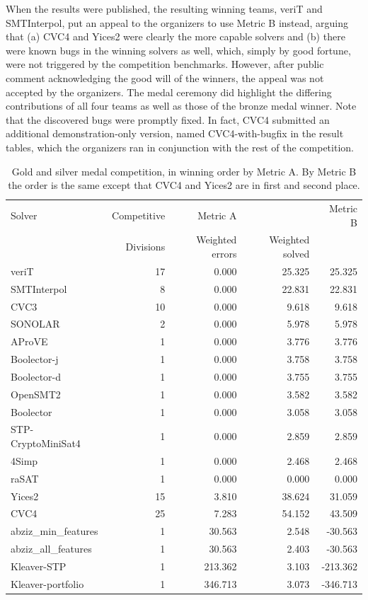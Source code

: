 \documentclass[twoside,11pt]{article}
\begin{document}
When the results were published, the resulting winning teams, veriT and SMTInterpol, put an appeal to the organizers to use Metric B instead, arguing that (a) CVC4 and Yices2 were clearly the more capable solvers and (b) there were known bugs in the winning solvers as well, which, simply by good fortune, were not triggered by the competition benchmarks. However, after public comment acknowledging the good will of the winners, the appeal was not accepted by the organizers. The medal ceremony did highlight the differing contributions of all four teams as well as those of the bronze medal winner. Note that the discovered bugs were promptly fixed. In fact, CVC4 submitted an additional demonstration-only version, named CVC4-with-bugfix in the result tables, which the organizers ran in conjunction with the rest of the competition.

\begin{table}
\centering
\begin{tabular}{|l|r|rr|r|}
\hline
Solver  & Competitive & Metric A & & Metric B \\
 & Divisions & Weighted errors & Weighted solved & \\
\hline
veriT & 17 &	0.000 	& 	25.325 & 25.325 \\
SMTInterpol & 8 &	0.000 	& 	22.831 & 22.831 \\
CVC3 & 10	& 	0.000 	& 	9.618 & 9.618 \\
SONOLAR 	& 2	&  	0.000 	& 	5.978 & 	5.978\\
AProVE 		& 1 & 	0.000 	& 	3.776	& 	3.776\\
Boolector-j & 1	&  	0.000 	& 	3.758	& 	3.758\\
Boolector-d & 1		&  	0.000 	& 	3.755 & 	3.755\\
OpenSMT2 	& 1	&  	0.000 &	3.582 &	3.582\\
Boolector & 1		&  	0.000 &	3.058  &	3.058 \\
STP-CryptoMiniSat4 	& 1	&  	0.000 &	2.859 &	2.859\\
4Simp 	& 1	& 	0.000 	& 	2.468  	& 	2.468 \\
raSAT 	& 1	& 	0.000 	& 	0.000 	& 	0.000 \\
Yices2 	& 15	&  	3.810 	& 	38.624 & 31.059 \\
CVC4 		& 25 &  	7.283 	& 	54.152 & 43.509 \\
abziz\_min\_features 	& 1	& 	30.563 	& 	2.548 & -30.563 \\
abziz\_all\_features 	& 1	&  	30.563 	& 	2.403 & -30.563 \\
Kleaver-STP 	& 1	&  	213.362 	& 	3.103 & -213.362 \\
Kleaver-portfolio & 1		&  	346.713 	& 	3.073  & -346.713 \\
\hline
\end{tabular}
\vspace{.2in}
\caption{Gold and silver medal competition, in winning order by Metric A. By Metric B the order is the same except that CVC4 and Yices2 are in first and second place.}
\label{Table:medals}
\end{table}
\end{document}
